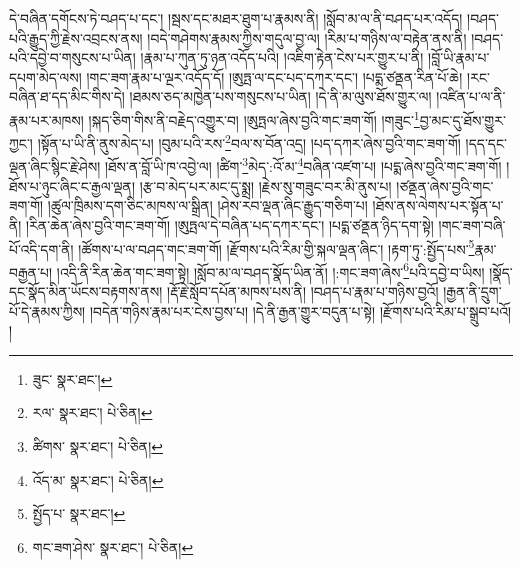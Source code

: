 དེ་བཞིན་དགོངས་ཏེ་བཤད་པ་དང་། །སྦས་དང་མཐར་ཐུག་པ་རྣམས་ནི། །སློབ་མ་ལ་ནི་བཤད་པར་འདོད། །བཤད་པའི་རྒྱུད་ཀྱི་རྗེས་འབྲངས་ནས། །བདེ་གཤེགས་རྣམས་ཀྱིས་གདུལ་བྱ་ལ། །རིམ་པ་གཉིས་ལ་བརྟེན་ནས་ནི། །བཤད་པའི་དབྱེ་བ་གསུངས་པ་ཡིན། །རྣམ་པ་ཀུན་ཏུ་ཉན་འདོད་པའི། །འཇིག་རྟེན་ངེས་པར་གྱུར་པ་ནི། །བློ་ཡི་རྣམ་པ་དཔག་མེད་ལས། །གང་ཟག་རྣམ་པ་ལྔར་འདོད་དོ། །ཨུཏྤ་ལ་དང་པད་དཀར་དང་། །པདྨ་ཙནྡན་རིན་པོ་ཆེ། །རང་བཞིན་ཐ་དད་མིང་གིས་དེ། །ཐམས་ཅད་མཁྱེན་པས་གསུངས་པ་ཡིན། །དེ་ནི་མ་ལུས་ཐོས་གྱུར་ལ། །འཛིན་པ་ལ་ནི་རྣམ་པར་མཁས། །སྐད་ཅིག་གིས་ནི་བརྗེད་འགྱུར་བ། །ཨུཏྤལ་ཞེས་བྱའི་གང་ཟག་གོ། །གཟུང་\footnote{ཟུང་  སྣར་ཐང་། }བྱ་མང་དུ་ཐོས་གྱུར་ཀྱང་། །སྟོན་པ་ཡི་ནི་ནུས་མེད་པ། །བུམ་པའི་རས་\footnote{རལ་  སྣར་ཐང་།  པེ་ཅིན། }བལ་ས་བོན་འདྲ། །པད་དཀར་ཞེས་བྱའི་གང་ཟག་གོ། །དད་དང་ལྡན་ཞིང་སྙིང་རྗེ་ཤེས། །ཐོས་ན་བློ་ཡི་ཁ་འབྱེ་ལ། །ཚིག་\footnote{ཚིགས་  སྣར་ཐང་།  པེ་ཅིན། }མེད་:འོ་མ་\footnote{འོད་མ་  སྣར་ཐང་།  པེ་ཅིན། }བཞིན་འཛག་པ། །པདྨ་ཞེས་བྱའི་གང་ཟག་གོ། །ཐོས་པ་ཉུང་ཞིང་ང་རྒྱལ་ལྡན། །རྩ་བ་མེད་པར་མང་དུ་སྨྲ། །རྗེས་སུ་གཟུང་བར་མི་ནུས་པ། །ཙནྡན་ཞེས་བྱའི་གང་ཟག་གོ། །ཚུལ་ཁྲིམས་དག་ཅིང་མཁས་ལ་སྒྲིན། །ཤེས་རབ་ལྡན་ཞིང་རྒྱུད་གཅིག་པ། །ཐོས་ནས་ལེགས་པར་སྟོན་པ་ནི། །རིན་ཆེན་ཞེས་བྱའི་གང་ཟག་གོ། །ཨུཏྤལ་དེ་བཞིན་པད་དཀར་དང་། །པདྨ་ཙནྡན་ཉིད་དག་སྟེ། །གང་ཟག་བཞི་པོ་འདི་དག་ནི། །ཚོགས་པ་ལ་བཤད་གང་ཟག་གོ། །རྫོགས་པའི་རིམ་གྱི་སྐལ་ལྡན་ཞིང་། །རྟག་ཏུ་:སྤྱོད་པས་\footnote{སྤྱོད་པ་  སྣར་ཐང་། }རྣམ་བརྒྱན་པ། །འདི་ནི་རིན་ཆེན་གང་ཟག་སྟེ། །སློབ་མ་ལ་བཤད་སྣོད་ཡིན་ནོ། །:གང་ཟག་ཞེས་\footnote{གང་ཟག་ཤེས་  སྣར་ཐང་།  པེ་ཅིན། }པའི་དབྱེ་བ་ཡིས། །སྣོད་དང་སྣོད་མིན་ཡོངས་བརྟགས་ནས། །རྡོ་རྗེ་སློབ་དཔོན་མཁས་པས་ནི། །བཤད་པ་རྣམ་པ་གཉིས་བྱའོ། །རྒྱན་ནི་དྲུག་པོ་དེ་རྣམས་ཀྱིས། །བདེན་གཉིས་རྣམ་པར་ངེས་བྱས་པ། །དེ་ནི་རྒྱན་གྱུར་བདུན་པ་སྟེ། །རྫོགས་པའི་རིམ་པ་སྒྲུབ་པའོ། །

